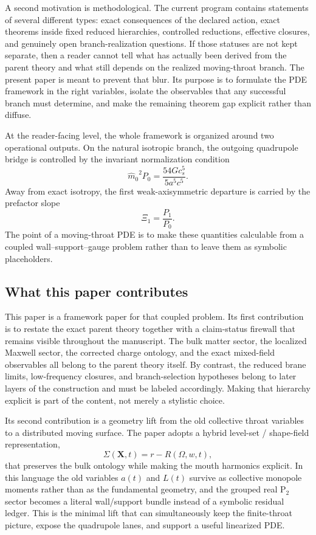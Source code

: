\documentclass[11pt]{article}
\theoremstyle{definition}
\newcommand{\Ptwo}{\ensuremath{\mathrm{P}_2}}
\newcommand{\mhat}{\ensuremath{\hat m_0}}
\newcommand{\XiOne}{\ensuremath{\Xi_1}}
\begin{document}
A second motivation is methodological. The current program contains statements of several different types: exact consequences of the declared action, exact theorems inside fixed reduced hierarchies, controlled reductions, effective closures, and genuinely open branch-realization questions. If those statuses are not kept separate, then a reader cannot tell what has actually been derived from the parent theory and what still depends on the realized moving-throat branch. The present paper is meant to prevent that blur. Its purpose is to formulate the PDE framework in the right variables, isolate the observables that any successful branch must determine, and make the remaining theorem gap explicit rather than diffuse.

At the reader-facing level, the whole framework is organized around two operational outputs. On the natural isotropic branch, the outgoing quadrupole bridge is controlled by the invariant normalization condition
\[
\mhat^{2} P_0 = \frac{54 G c_s^5}{5 a^5 c^5}.
\]
Away from exact isotropy, the first weak-axisymmetric departure is carried by the prefactor slope
\[
\XiOne = \frac{P_1}{P_0}.
\]
The point of a moving-throat PDE is to make these quantities calculable from a coupled wall--support--gauge problem rather than to leave them as symbolic placeholders.

\subsection{What this paper contributes}

This paper is a framework paper for that coupled problem. Its first contribution is to restate the exact parent theory together with a claim-status firewall that remains visible throughout the manuscript. The bulk matter sector, the localized Maxwell sector, the corrected charge ontology, and the exact mixed-field observables all belong to the parent theory itself. By contrast, the reduced brane limits, low-frequency closures, and branch-selection hypotheses belong to later layers of the construction and must be labeled accordingly. Making that hierarchy explicit is part of the content, not merely a stylistic choice.

Its second contribution is a geometry lift from the old collective throat variables to a distributed moving surface. The paper adopts a hybrid level-set / shape-field representation,
\[
\Sigma(\mathbf X,t)=r-R(\Omega,w,t),
\]
that preserves the bulk ontology while making the mouth harmonics explicit. In this language the old variables $a(t)$ and $L(t)$ survive as collective monopole moments rather than as the fundamental geometry, and the grouped real $\Ptwo$ sector becomes a literal wall/support bundle instead of a symbolic residual ledger. This is the minimal lift that can simultaneously keep the finite-throat picture, expose the quadrupole lanes, and support a useful linearized PDE.
\end{document}
